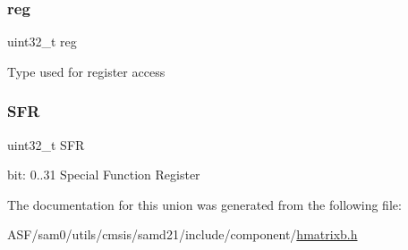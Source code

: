 \subsubsection{\texorpdfstring{reg}{reg}}
{\footnotesize\ttfamily uint32\+\_\+t reg}

Type used for register access \mbox{\label{union_h_m_a_t_r_i_x_b___s_f_r___type_a9fab63593f960af63f0369bdc0b94a42}} 
\subsubsection{\texorpdfstring{SFR}{SFR}}
{\footnotesize\ttfamily uint32\+\_\+t S\+FR}

bit\+: 0..31 Special Function Register 

The documentation for this union was generated from the following file\+:\begin{DoxyCompactItemize}
\item 
A\+S\+F/sam0/utils/cmsis/samd21/include/component/\mbox{\hyperlink{hmatrixb_8h}{hmatrixb.\+h}}\end{DoxyCompactItemize}
